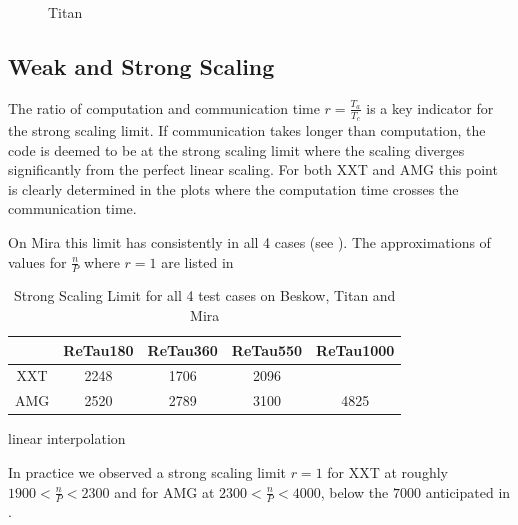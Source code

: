 \documentclass{sig-alternate}
\begin{document}
\begin{figure}
{  }
\caption{Titan}
\label{fig:scaling_titan}
\end{figure}


\subsection{Weak and Strong Scaling}

The ratio of computation and communication time $r=\frac{T_a}{T_c}$ is a key
indicator for the strong scaling limit. If communication takes longer than
computation, the code is deemed to be at the strong scaling limit where the
scaling diverges significantly from the perfect linear scaling. For both XXT and
AMG this point is clearly determined in the plots where the computation time
crosses the communication time. 

On Mira this limit has consistently in all 4 cases (see
). The approximations of values for $\frac{n}{P}$ where
$r=1$ are listed in 
\begin{table}  
  \caption{Strong Scaling Limit for all 4 test cases on Beskow, Titan and Mira}
  \begin{tabular}{c||cccc}
    \hline
    \hline
    &ReTau180&ReTau360&ReTau550&ReTau1000\\
    \hline
    XXT&2248&1706&2096&\\
    AMG&2520&2789&3100&4825\\
  \end{tabular}
\end{table}

linear interpolation

In practice we observed a strong scaling limit $r=1$ for XXT at roughly $1900<
\frac{n}{P} < 2300$ and for AMG at $2300<\frac{n}{P}<4000$, below the $7000$
anticipated in \cite{fischer:scaling}. 
\end{document}
